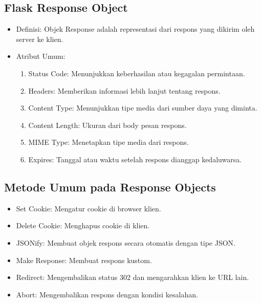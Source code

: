 \documentclass{article}
\begin{document}
\subsection{Flask Response Object}
\begin{itemize}
    \item Definisi: Objek Response adalah representasi dari respons yang dikirim oleh server ke klien.
    \item Atribut Umum:
          \begin{enumerate}
              \item Status Code: Menunjukkan keberhasilan atau kegagalan permintaan.
              \item Headers: Memberikan informasi lebih lanjut tentang respons.
              \item Content Type: Menunjukkan tipe media dari sumber daya yang diminta.
              \item Content Length: Ukuran dari body pesan respons.
              \item MIME Type: Menetapkan tipe media dari respons.
              \item Expires: Tanggal atau waktu setelah respons dianggap kedaluwarsa.
          \end{enumerate}
\end{itemize}

\subsection{Metode Umum pada Response Objects}
\begin{itemize}
    \item Set Cookie: Mengatur cookie di browser klien.
    \item Delete Cookie: Menghapus cookie di klien.
    \item JSONify: Membuat objek respons secara otomatis dengan tipe JSON.
    \item Make Response: Membuat respons kustom.
    \item Redirect: Mengembalikan status 302 dan mengarahkan klien ke URL lain.
    \item Abort: Mengembalikan respons dengan kondisi kesalahan.
\end{itemize}
\end{document}

